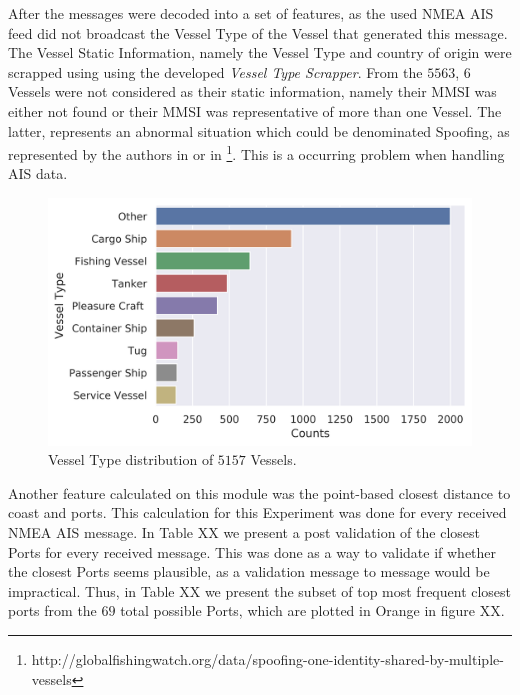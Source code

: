 After the messages were decoded into a set of features, as the used NMEA AIS feed did not broadcast the Vessel Type of the Vessel that generated this message. The Vessel Static Information, namely the Vessel Type and country of origin were scrapped using using the developed \emph{Vessel Type Scrapper}. From the $5563$, $6$ Vessels were not considered as their static information, namely their MMSI was either not found or their MMSI was representative of more than one Vessel. The latter, represents an abnormal situation which could be denominated Spoofing, as represented by the authors in \cite{Ray2015DeAISRisks} or in \footnote{http://globalfishingwatch.org/data/spoofing-one-identity-shared-by-multiple-vessels}. This is a occurring problem when handling AIS data. 

\begin{figure}[H]
	\centering
	\includegraphics[scale = .7]{figures/Ch5/DataValidationVesselType.png}
    \caption{Vessel Type distribution of $5157$ Vessels.}
    \label{fig: 5 Vessel Type Distribution}
\end{figure}


Another feature calculated on this module was the point-based closest distance to coast and ports. This calculation for this Experiment was done for every received NMEA AIS message. In Table XX we present a post validation of the closest Ports for every received message. This was done as a way to validate if whether the closest Ports seems plausible, as a validation message to message would be impractical. Thus, in Table XX we present the subset of top most frequent closest ports from the $69$ total possible Ports, which are plotted in Orange in figure XX.

